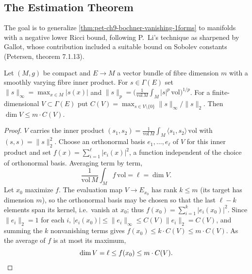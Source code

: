 \subsection{The Estimation Theorem}

The goal is to generalize \cref{thm:pet-ch9-bochner-vanishing-1forms} to
manifolds with a negative lower Ricci bound, following P.\ Li's technique as
sharpened by Gallot, whose contribution included a suitable bound on Sobolev
constants (Petersen, theorem 7.1.13).

\begin{lemma}[Lemma 9.2.6 (P.\ Li)]
  \label{lem:pet-ch9-li-dimension-estimate}
  Let $(M,g)$ be compact and $E\to M$ a vector bundle of fibre dimension $m$
  with a smoothly varying fibre inner product. For $s\in\Gamma(E)$ set
  $\|s\|_\infty=\max_{x\in M}|s(x)|$ and $\|s\|_p=\big(\tfrac1{\mathrm{vol}\,M}
  \int_M|s|^p\,\mathrm{vol}\big)^{1/p}$. For a finite-dimensional $V\subset\Gamma(E)$
  put $C(V)=\max_{s\in V\setminus\{0\}}\|s\|_\infty/\|s\|_2$. Then
  $\dim V\le m\cdot C(V)$.
\end{lemma}
\begin{proof}
  $V$ carries the inner product $(s_1,s_2)=\tfrac1{\mathrm{vol}\,M}\int_M
  \langle s_1,s_2\rangle\,\mathrm{vol}$ with $(s,s)=\|s\|_2^2$. Choose an orthonormal
  basis $e_1,\dots,e_\ell$ of $V$ for this inner product and set
  $f(x)=\sum_{i=1}^\ell|e_i(x)|^2$, a function independent of the choice of
  orthonormal basis. Averaging term by term,
  \[
    \frac1{\mathrm{vol}\,M}\int_Mf\,\mathrm{vol}=\ell=\dim V.
  \]
  Let $x_0$ maximize $f$. The evaluation map $V\to E_{x_0}$ has rank $k\le m$
  (its target has dimension $m$), so the orthonormal basis may be chosen so
  that the last $\ell-k$ elements span its kernel, i.e.\ vanish at $x_0$; thus
  $f(x_0)=\sum_{i=1}^k|e_i(x_0)|^2$. Since $\|e_i\|_2=1$ for each $i$,
  $|e_i(x_0)|\le\|e_i\|_\infty\le C(V)\|e_i\|_2=C(V)$, and summing the $k$
  nonvanishing terms gives $f(x_0)\le k\cdot C(V)\le m\cdot C(V)$. As the
  average of $f$ is at most its maximum,
  \[
    \dim V=\ell\le f(x_0)\le m\cdot C(V).\qedhere
  \]
\end{proof}

